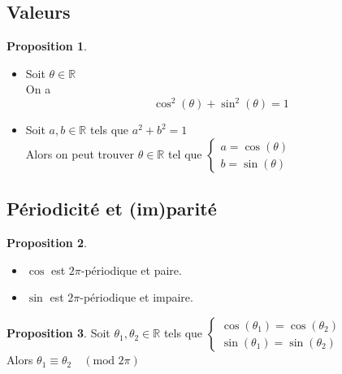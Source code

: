 \documentclass[10pt,a4paper]{article}
\theoremstyle{definition}
\newtheorem{proposition}{Proposition}[section]
\begin{document}
\subsection{Valeurs}
\begin{proposition}
\hfill
\begin{itemize}
\item Soit $\theta \in \mathbb{R}$ \\
On a
\[\cos^2(\theta) + \sin^2(\theta) = 1\]
\item Soit $a, b \in \mathbb{R}$ tels que $a^2 + b^2 = 1$ \\
Alors on peut trouver $\theta \in \mathbb{R}$ tel que $\begin{cases}
a = \cos(\theta) \\
b = \sin(\theta)
\end{cases}$
\end{itemize}
\end{proposition}

\subsection{Périodicité et (im)parité}
\begin{proposition}
\hfill
\begin{itemize}
\item $\cos$ est $2\pi$-périodique et paire.
\item $\sin$ est $2\pi$-périodique et impaire.
\end{itemize}
\end{proposition}
\begin{proposition}
Soit $\theta_1, \theta_2 \in \mathbb{R}$ tels que $\begin{cases}
\cos(\theta_1) = \cos(\theta_2) \\
\sin(\theta_1) = \sin(\theta_2)
\end{cases}$ \\
Alors $\theta_1 \equiv \theta_2 \quad (\text{mod }2\pi)$
\end{proposition}
\end{document}
